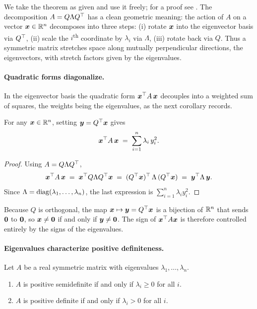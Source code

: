We take the theorem as given and use it freely; for a proof see \citet[][\S 6.4]{Strang2016}. The decomposition \(A = Q \Lambda Q^{\top}\) has a clean geometric meaning: the action of \(A\) on a vector \(\bm{x} \in \mathbb{R}^n\) decomposes into three steps: (i) rotate \(\bm{x}\) into the eigenvector basis via \(Q^{\top}\), (ii) scale the \(i\)\textsuperscript{th} coordinate by \(\lambda_i\) via \(\Lambda\), (iii) rotate back via \(Q\). Thus a symmetric matrix stretches space along mutually perpendicular directions, the eigenvectors, with stretch factors given by the eigenvalues.

\paragraph{Quadratic forms diagonalize.}
In the eigenvector basis the quadratic form \(\bm{x}^{\top} A\,\bm{x}\) decouples into a weighted sum of squares, the weights being the eigenvalues, as the next corollary records.

\begin{corollary}\label{cor:quad-form}
For any \(\bm{x} \in \mathbb{R}^n\), setting \(\bm{y} = Q^{\top} \bm{x}\) gives
\[
  \bm{x}^{\top} A\, \bm{x} \;=\; \sum_{i=1}^n \lambda_i\, y_i^2.
\]
\end{corollary}

\begin{proof}
Using \(A = Q \Lambda Q^{\top}\),
\[
  \bm{x}^{\top} A\, \bm{x}
  \;=\; \bm{x}^{\top} Q \Lambda Q^{\top} \bm{x}
  \;=\; (Q^{\top} \bm{x})^{\top}\, \Lambda\, (Q^{\top} \bm{x})
  \;=\; \bm{y}^{\top} \Lambda\, \bm{y}.
\]
Since \(\Lambda = \operatorname{diag}(\lambda_1, \ldots, \lambda_n)\), the last expression is \(\sum_{i=1}^n \lambda_i y_i^2\).
\end{proof}

Because \(Q\) is orthogonal, the map \(\bm{x} \mapsto \bm{y} = Q^{\top} \bm{x}\) is a bijection of \(\mathbb{R}^n\) that sends \(\bm{0}\) to \(\bm{0}\), so \(\bm{x} \ne \bm{0}\) if and only if \(\bm{y} \ne \bm{0}\). The sign of \(\bm{x}^{\top} A \bm{x}\) is therefore controlled entirely by the signs of the eigenvalues.

\paragraph{Eigenvalues characterize positive definiteness.}

\begin{theorem}\label{thm:pd-psd-eigen}
Let \(A\) be a real symmetric matrix with eigenvalues \(\lambda_1, \ldots, \lambda_n\).
\begin{enumerate}[label=\textnormal{(\arabic*)},leftmargin=*]
  \item \(A\) is positive semidefinite if and only if \(\lambda_i \ge 0\) for all \(i\).
  \item \(A\) is positive definite if and only if \(\lambda_i > 0\) for all \(i\).
\end{enumerate}
\end{theorem}

